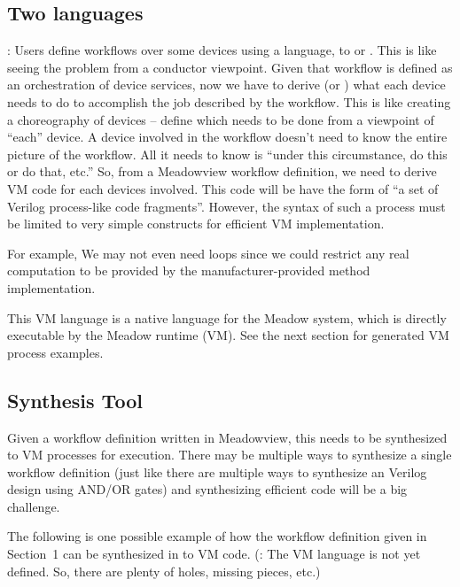 \documentclass{note}
\begin{document}
\subsection{Two languages}
\bit
\w {}: 
   Users define workflows over some devices using a language, to
    or .
   \bit
   \w This is like seeing the problem from a conductor viewpoint. 
   \eit
\w {}
   Given that workflow is  defined as an orchestration of device services, now
   we have to derive (or ) what each device needs to do to
   accomplish the job described by the workflow. 
   \bit
   \w This is like creating a choreography of devices -- define which needs to
   be done from a viewpoint of ``each'' device. 
   A device involved in the workflow doesn't need to know the entire picture
   of the workflow. All it needs to know is ``under this circumstance, do this
   or do that, etc.'' 
   \w So, from a Meadowview workflow definition, we need to derive VM code for
   each devices involved. This code will be have the form of ``a set of
   Verilog process-like code fragments''. However, the syntax of such a
   process must be limited to very simple constructs for efficient VM
   implementation.

   For example, We may not even need loops since we could restrict any real computation to
   be provided by the manufacturer-provided method implementation.
   
   This VM language is a native language for the Meadow system, which
   is directly executable by the Meadow runtime (VM). See the next section for
   generated VM process examples.
   \eit
\eit

\subsection{Synthesis Tool}
Given a workflow definition written in Meadowview, this needs to be
synthesized to VM processes for execution. There may be multiple ways to
synthesize a single workflow definition (just like there are multiple ways to
synthesize an Verilog design using AND/OR gates) and synthesizing efficient
code will be a big challenge.  

The following is one possible example of how the workflow definition given in
Section~1 can be synthesized in to VM code. (: The VM language is not
yet defined. So, there are plenty of holes, missing pieces, etc.)
\end{document}
